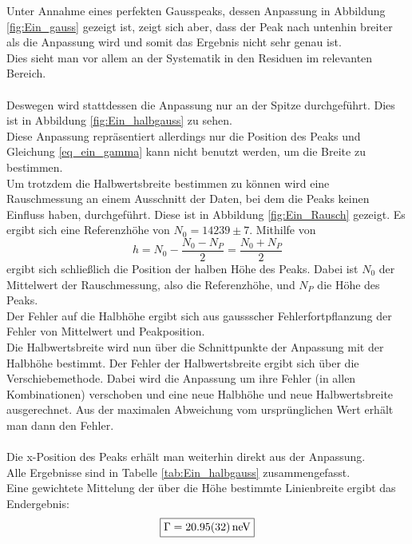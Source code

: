 \documentclass[12pt,a4paper]{article}
\begin{document}
Unter Annahme eines perfekten Gausspeaks, dessen Anpassung in Abbildung \ref{fig:Ein_gauss} gezeigt ist, zeigt sich aber, dass der Peak nach untenhin breiter als die Anpassung wird und somit das Ergebnis nicht sehr genau ist.\\
Dies sieht man vor allem an der Systematik in den Residuen im relevanten Bereich.\\
\\
Deswegen wird stattdessen die Anpassung nur an der Spitze durchgeführt. Dies ist in Abbildung \ref{fig:Ein_halbgauss} zu sehen.\\
Diese Anpassung repräsentiert allerdings nur die Position des Peaks und Gleichung \ref{eq_ein_gamma} kann nicht benutzt werden, um die Breite zu bestimmen.\\
Um trotzdem die Halbwertsbreite bestimmen zu können wird eine Rauschmessung an einem Ausschnitt der Daten, bei dem die Peaks keinen Einfluss haben, durchgeführt. Diese ist in Abbildung \ref{fig:Ein_Rausch} gezeigt. Es ergibt sich eine Referenzhöhe von $N_0 = 14239\pm 7$.
Mithilfe von 
\begin{equation*}
h = N_0 - \dfrac{N_0-N_P}{2} = \dfrac{N_0+N_P}{2}
\end{equation*}
ergibt sich schließlich die Position der halben Höhe des Peaks. Dabei ist $N_0$ der Mittelwert der Rauschmessung, also die Referenzhöhe, und $N_P$ die Höhe des Peaks.\\
Der Fehler auf die Halbhöhe ergibt sich aus gaussscher Fehlerfortpflanzung der Fehler von Mittelwert und Peakposition.\\
Die Halbwertsbreite wird nun über die Schnittpunkte der Anpassung mit der Halbhöhe bestimmt. Der Fehler der Halbwertsbreite ergibt sich über die Verschiebemethode. Dabei wird die Anpassung um ihre Fehler (in allen Kombinationen) verschoben und eine neue Halbhöhe und neue Halbwertsbreite ausgerechnet. Aus der maximalen Abweichung vom ursprünglichen Wert erhält man dann den Fehler.\\
\\
Die x-Position des Peaks erhält man weiterhin direkt aus der Anpassung.\\
Alle Ergebnisse sind in Tabelle \ref{tab:Ein_halbgauss} zusammengefasst.\\
Eine gewichtete Mittelung der über die Höhe bestimmte Linienbreite ergibt das Endergebnis:
\begin{equation*}
\boxed{\Gamma = \SI{20.95\pm 0.32}{neV}}
\end{equation*}
\end{document}
